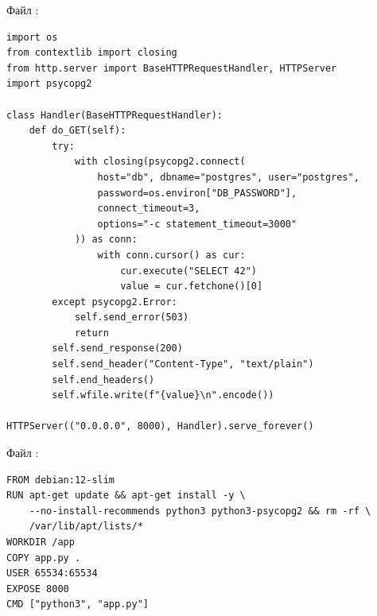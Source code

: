\par\addvspace{10pt}\noindent\begin{minipage}{\linewidth}
\setlength{\parindent}{0pt}\noindent\hspace*{1.25cm}Файл :\par\kern 10pt
\begin{verbatim}
import os
from contextlib import closing
from http.server import BaseHTTPRequestHandler, HTTPServer
import psycopg2

class Handler(BaseHTTPRequestHandler):
    def do_GET(self):
        try:
            with closing(psycopg2.connect(
                host="db", dbname="postgres", user="postgres",
                password=os.environ["DB_PASSWORD"],
                connect_timeout=3,
                options="-c statement_timeout=3000"
            )) as conn:
                with conn.cursor() as cur:
                    cur.execute("SELECT 42")
                    value = cur.fetchone()[0]
        except psycopg2.Error:
            self.send_error(503)
            return
        self.send_response(200)
        self.send_header("Content-Type", "text/plain")
        self.end_headers()
        self.wfile.write(f"{value}\n".encode())

HTTPServer(("0.0.0.0", 8000), Handler).serve_forever()
\end{verbatim}
\end{minipage}\par\addvspace{10pt}

\par\addvspace{10pt}\noindent\begin{minipage}{\linewidth}
\setlength{\parindent}{0pt}\noindent\hspace*{1.25cm}Файл :\par\kern 10pt
\begin{verbatim}
FROM debian:12-slim
RUN apt-get update && apt-get install -y \
    --no-install-recommends python3 python3-psycopg2 && rm -rf \
    /var/lib/apt/lists/*
WORKDIR /app
COPY app.py .
USER 65534:65534
EXPOSE 8000
CMD ["python3", "app.py"]
\end{verbatim}
\end{minipage}\par\addvspace{10pt}

